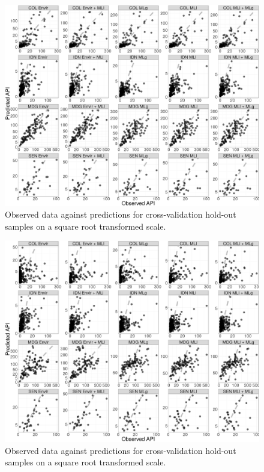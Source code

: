 \documentclass[11pt]{article}
\begin{document}


\begin{figure}
  \includegraphics[width=\textwidth]{figs/cv1_scatter.png}
\caption{
  Observed data against predictions for cross-validation hold-out samples on a square root transformed scale.
}
\label{f:scatter1}
\end{figure}


\begin{figure}
  \includegraphics[width=\textwidth]{figs/cv2_scatter.png}
\caption{
  Observed data against predictions for cross-validation hold-out samples on a square root transformed scale.
}
\label{f:scatter2}
\end{figure}
\end{document}
